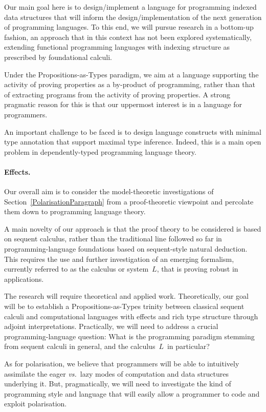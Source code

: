 \documentclass[11pt,twocolumn]{article}
\newcommand{\hl}[1]{#1}%
\newcommand{\vs}{\emph{vs.}}
\newcommand{\SysL}{$L$}%
\begin{document}
Our main \hl{goal} here is to design/implement a language for programming
indexed data structures that will inform the design/implementation of the next
generation of programming languages.  To this end, we will pursue
\hl{research} in a bottom-up fashion, an approach that in this context has not
been explored systematically, extending functional programming languages with
indexing structure as prescribed by foundational calculi.

Under the Propositions-as-Types paradigm, we \hl{aim} at a language
supporting the activity of proving properties as a by-product of programming,
rather than that of extracting programs from the activity of proving
properties.  A strong pragmatic reason for this is that our uppermost interest
is in a language for programmers. 

An important \hl{challenge} to be faced is to design language constructs
with minimal type annotation that support maximal type inference.  Indeed,
this is a main open problem in dependently-typed programming language theory.

\paragraph{Effects.}
\label{ProgrammingEffectsParagraph}

Our overall \hl{aim} is to consider the model-theoretic investigations of
Section~\ref{PolarisationParagraph} from a proof-theoretic viewpoint and
percolate them down to programming language theory.

A main \hl{novelty} of our approach is that the proof theory to be
considered is based on sequent calculus, rather than the traditional line
followed so far in programming-language foundations based on sequent-style
natural deduction.  This requires the use and further investigation of an
emerging formalism, currently referred to as the calculus or system~\SysL,
that is proving robust in applications.

The research will require theoretical and applied work.  Theoretically, our
\hl{goal} will be to establish a Propositions-as-Types trinity between
classical sequent calculi and computational languages with effects and rich
type structure through adjoint interpretations.  Practically, we will need to
address a crucial programming-language \hl{question}:  What is the
programming paradigm stemming from sequent calculi in general, and the
calculus~\SysL\ in particular? 

As for polarisation, we believe that programmers will be able to intuitively
assimilate the eager {\vs}~lazy modes of computation and data structures
underlying it.  But, pragmatically, we will need to \hl{investigate} the
kind of programming style and language that will easily allow a programmer to
code and exploit polarisation.
\end{document}

